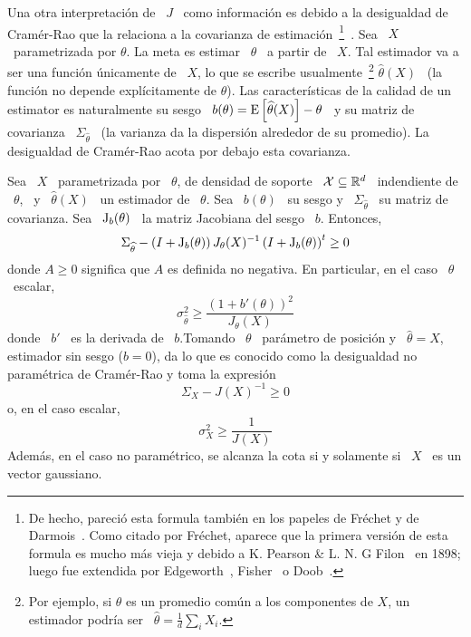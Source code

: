 Una  otra  interpretaci\'on  de \  $J$  \  como  informaci\'on  es debido  a  la
desigualdad   de   Cram\'er-Rao   que   la   relaciona  a   la   covarianza   de
estimaci\'on~\footnote{De hecho, pareci\'o esta formula tambi\'en en los papeles
  de  Fr\'echet y  de Darmois~\cite{Fre43,  Dar45}. Como  citado  por Fr\'echet,
  aparece que la primera versi\'on de esta formula es mucho m\'as vieja y debido
  a K.  Pearson  \& L. N.  G Filon~\cite{PeaFil98} en  1898; luego fue extendida
  por          Edgeworth~\cite{Edg08},          Fisher~\cite{Fis25:07}         o
  Doob~\cite{Doo36}.}~\cite{Rao45,  Rao92,  RaoWis47,  Cra46,  Rio07,  CovTho06,
  Fri04, Kay93,  Bos07}.  Sea \  $X$ \ parametrizada  por $\theta$.  La  meta es
estimar \ $\theta$  \ a partir de \  $X$.  Tal estimador va a  ser una funci\'on
\'unicamente de  \ $X$, lo  que se escribe usualmente~\footnote{Por  ejemplo, si
  $\theta$  es  un promedio  com\'un  a los  componentes  de  $X$, un  estimador
  podr\'ia    ser    \     $\widehat{\theta}    =    \frac1d    \sum_i    X_i$.}
$\widehat{\theta}(X)$ \ (la funci\'on  no depende expl\'icitamente de $\theta$).
Las caracter\'isticas de  la calidad de un estimator es  naturalmente su sesgo \
$b(\theta) = \operatorname{E}\left[  \widehat{\theta}(X) \right] - \theta$ \  y su matriz de
covarianza  \  $\Sigma_{\widehat{\theta}}$ \  (la  varianza  da la  dispersi\'on
alrededor de su promedio).  La desigualdad de Cram\'er-Rao acota por debajo esta
covarianza.
%
\begin{teorema}
  Sea  \ $X$  \  parametrizada por  \ $\theta$,  de  densidad de  soporte \  $\mathcal{X}
  \subseteq \mathbb{R}^d$ \ indendiente de  \ $\theta$, \ y \ $\widehat{\theta}(X)$ \
  un  estimador   de  \   $\theta$.   Sea   \  $b(\theta)$  \   su  sesgo   y  \
  $\Sigma_{\widehat{\theta}}$ \ su matriz de covarianza.  Sea \ $\operatorname{J}_b(\theta)$
  \ la matriz Jacobiana del sesgo \ $b$.  Entonces,
  \[
  \Sigma_{\widehat{\theta}} - \left( I + \operatorname{J}_b(\theta) \right) J_\theta(X)^{-1}
  \left( I + \operatorname{J}_b(\theta) \right)^t \ge 0
  \]
  donde $A \ge 0$ significa que  $A$ es definida no negativa.  En particular, en
  el caso \ $\theta$ \ escalar,
  \[
  \sigma_{\widehat{\theta}}^2 \ge \frac{(1+b'(\theta))^2}{J_\theta(X)}
  \]
  donde  \  $b'$ \  es  la  derivada de  \  $b$.\newline  Tomando  \ $\theta$  \
  par\'ametro de posici\'on y \  $\widehat{\theta} = X$, estimador sin sesgo ($b
  =  0$),  da  lo que  es  conocido  como  la  desigualdad no  param\'etrica  de
  Cram\'er-Rao y toma la expresi\'on
  \[
  \Sigma_X - J(X)^{-1} \ge 0
  \]
  o, en el caso escalar,
  \[
  \sigma_X^2 \ge \frac{1}{J(X)}
  \]
  Adem\'as, en el caso no param\'etrico, se  alcanza la cota si y solamente si \
  $X$ \ es un vector gaussiano.
\end{teorema}
